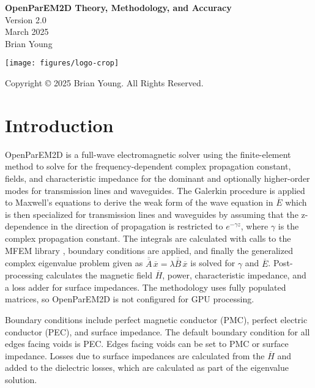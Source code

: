 \documentclass[titlepage]{article}
\renewcommand\_{\textunderscore\linebreak[1]}
\begin{document}
\begin{titlepage}

   \centering
   \vspace*{3cm}
   {\huge\bfseries OpenParEM2D Theory, Methodology, and Accuracy} \\
   \vskip1cm
   {\Large Version 2.0} \\
   \vskip1cm
   {\Large March 2025} \\
   \vskip1cm
   {\Large Brian Young} \\

   \vfill

   \texttt{[image: figures/logo-crop]}

   \vspace*{\fill}
   Copyright \copyright{} 2025 Brian Young. All Rights Reserved.
\end{titlepage}

\tableofcontents

\newpage
\section{Introduction}

OpenParEM2D is a full-wave electromagnetic solver using the finite-element method to solve for the frequency-dependent complex propagation constant, fields, and characteristic impedance for the dominant and optionally higher-order modes for transmission lines and waveguides.  The Galerkin procedure is applied to Maxwell's equations to derive the weak form of the wave equation in $\overline{E}$ which is then specialized for transmission lines and waveguides by assuming that the z-dependence in the direction of propagation is restricted to $e^{-\gamma z}$, where $\gamma$ is the complex propagation constant.  The integrals are calculated with calls to the MFEM library \cite{MFEM}\cite{MFEMweb}, boundary conditions are applied, and finally the generalized complex eigenvalue problem given as $\overline{\overline{A}}\,\overline{x}=\lambda\overline{\overline{B}}\,\overline{x}$ is solved for $\gamma$ and $\overline{E}$.  Post-processing calculates the magnetic field $\overline{H}$, power, characteristic impedance, and a loss adder for surface impedances.  The methodology uses fully populated matrices, so OpenParEM2D is not configured for GPU processing.

Boundary conditions include perfect magnetic conductor (PMC), perfect electric conductor (PEC), and surface impedance.  The default boundary condition for all edges facing voids is PEC.  Edges facing voids can be set to PMC or surface impedance.  Losses due to surface impedances are calculated from the $\overline{H}$ and added to the dielectric losses, which are calculated as part of the eigenvalue solution.
\end{document}
